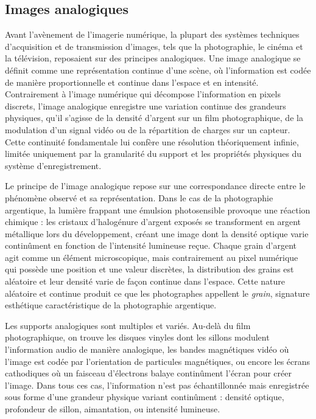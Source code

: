 \subsection{Images analogiques}
Avant l'avènement de l'imagerie numérique, la plupart des systèmes techniques d'acquisition et de transmission d'images, tels que la photographie, le cinéma et la télévision, reposaient sur des principes analogiques. Une image analogique se définit comme une représentation continue d'une scène, où l'information est codée de manière proportionnelle et continue dans l'espace et en intensité. Contrairement à l'image numérique qui décompose l'information en pixels discrets, l'image analogique enregistre une variation continue des grandeurs physiques, qu'il s'agisse de la densité d'argent sur un film photographique, de la modulation d'un signal vidéo ou de la répartition de charges sur un capteur. Cette continuité fondamentale lui confère une résolution théoriquement infinie, limitée uniquement par la granularité du support et les propriétés physiques du système d'enregistrement.

Le principe de l'image analogique repose sur une correspondance directe entre le phénomène observé et sa représentation. Dans le cas de la photographie argentique, la lumière frappant une émulsion photosensible provoque une réaction chimique : les cristaux d'halogénure d'argent exposés se transforment en argent métallique lors du développement, créant une image dont la densité optique varie continûment en fonction de l'intensité lumineuse reçue. Chaque grain d'argent agit comme un élément microscopique, mais contrairement au pixel numérique qui possède une position et une valeur discrètes, la distribution des grains est aléatoire et leur densité varie de façon continue dans l'espace. Cette nature aléatoire et continue produit ce que les photographes appellent le \textit{grain}, signature esthétique caractéristique de la photographie argentique.

Les supports analogiques sont multiples et variés. Au-delà du film photographique, on trouve les disques vinyles dont les sillons modulent l'information audio de manière analogique, les bandes magnétiques vidéo où l'image est codée par l'orientation de particules magnétiques, ou encore les écrans cathodiques où un faisceau d'électrons balaye continûment l'écran pour créer l'image. Dans tous ces cas, l'information n'est pas échantillonnée mais enregistrée sous forme d'une grandeur physique variant continûment : densité optique, profondeur de sillon, aimantation, ou intensité lumineuse.


